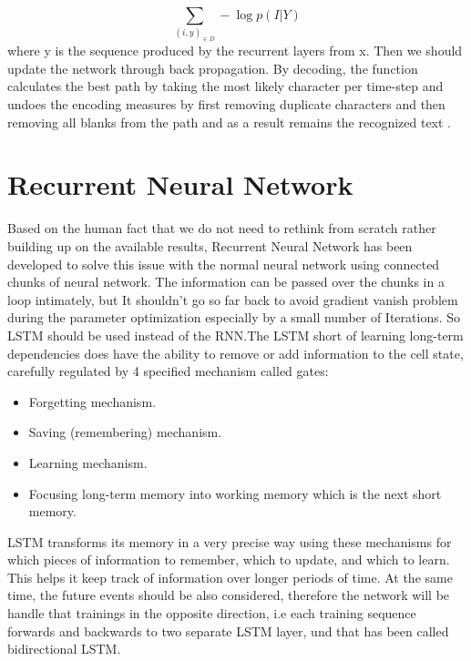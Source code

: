 \begin{equation}
\sum_{(i,y)_{\in D}} - \log  p( I | Y )
\label{eq3}
\end{equation}
where y is the sequence produced by the recurrent layers from x. Then we should update the network through back propagation. By decoding, the function calculates the best path by taking the most likely character per time-step and undoes the encoding measures by first removing duplicate characters and then removing all blanks from the path and as a result remains the recognized text \cite{CTC}.


\section{Recurrent Neural Network}\label{sec:rnn}
Based on the human fact that we do not need to rethink from scratch rather building up on the available results, Recurrent Neural Network has been developed to solve this issue with the normal neural network using connected chunks of neural network. The information can be passed over the chunks in a loop intimately, but It shouldn’t go so far back to avoid gradient vanish problem during the parameter optimization especially by a small number of Iterations. So LSTM should be used instead of the RNN.The LSTM short of learning long-term dependencies does have the ability to remove or add information to the cell state, carefully regulated by 4 specified mechanism called gates:
\begin{itemize}
\item Forgetting mechanism.
\item Saving (remembering) mechanism.
\item Learning mechanism.
\item Focusing long-term memory into working memory which is the next short memory.
\end{itemize}
LSTM transforms its memory in a very precise way using these mechanisms for which pieces of information to remember, which to update, and which to learn. This helps it keep track of information over longer periods of time. At the same time, the future events should be also considered, therefore the network will be handle that trainings in the opposite direction, i.e each training sequence forwards and backwards to two separate LSTM layer, und that has been called bidirectional LSTM. 
